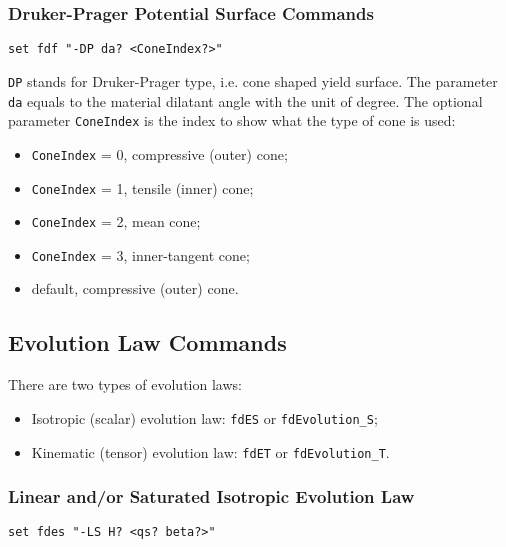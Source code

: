 \subsubsection{Druker-Prager Potential Surface Commands}
\label{fdDPps}

\begin{verbatim}
set fdf "-DP da? <ConeIndex?>" 
\end{verbatim}

\texttt{DP} stands for Druker-Prager type, i.e. cone shaped yield surface. 
The parameter \texttt{da} equals to the material dilatant angle with the unit of degree.
The optional parameter \texttt{ConeIndex} is the index to show what the type of cone is used:
\begin{itemize}
  \item \texttt{ConeIndex} = 0, compressive (outer) cone;
  \item \texttt{ConeIndex} = 1, tensile (inner) cone;
  \item \texttt{ConeIndex} = 2, mean cone;
  \item \texttt{ConeIndex} = 3, inner-tangent cone;
  \item default, compressive (outer) cone.
\end{itemize} 

\subsection{Evolution Law Commands}
\label{fdEL}

There are two types of evolution laws: 
\begin{itemize}
  \item Isotropic (scalar) evolution law: \texttt{fdES} or \texttt{fdEvolution\_S};
  \item Kinematic (tensor) evolution law: \texttt{fdET} or \texttt{fdEvolution\_T}.
\end{itemize} 

\subsubsection{Linear and/or Saturated Isotropic Evolution Law} 
\label{fdLSES}
\begin{verbatim}
set fdes "-LS H? <qs? beta?>"
\end{verbatim}

